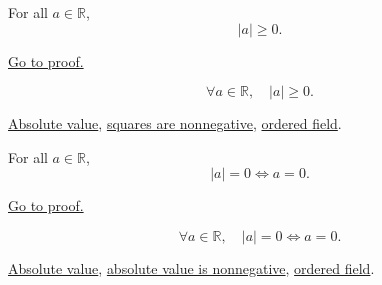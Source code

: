 \begin{theorem}
\label{thm:absolute-value-nonneg}
For all $a \in \mathbb{R}$,
\[
  \lvert a \rvert \ge 0.
\]
\end{theorem}



\begin{remark*}[Proof]
\hyperref[prf:absolute-value-nonneg]{Go to proof.}
\end{remark*}

\begin{remark*}
\[
  \forall a \in \mathbb{R},\quad \lvert a \rvert \ge 0.
\]
\end{remark*}

\begin{dependencies}
\hyperref[def:absolute-value]{Absolute value},
\hyperref[prop:product-of-positives-is-positive-q]{squares are nonnegative},
\hyperref[def:real-ordered-field]{ordered field}.
\end{dependencies}


\begin{theorem}
\label{thm:absolute-value-zero-iff-zero}
For all $a \in \mathbb{R}$,
\[
  \lvert a \rvert = 0 \iff a = 0.
\]
\end{theorem}



\begin{remark*}[Proof]
\hyperref[prf:absolute-value-zero-iff-zero]{Go to proof.}
\end{remark*}

\begin{remark*}
\[
  \forall a \in \mathbb{R},\quad
  \lvert a \rvert = 0 \iff a = 0.
\]
\end{remark*}

\begin{dependencies}
\hyperref[def:absolute-value]{Absolute value},
\hyperref[thm:absolute-value-nonneg]{absolute value is nonnegative},
\hyperref[def:real-ordered-field]{ordered field}.
\end{dependencies}


